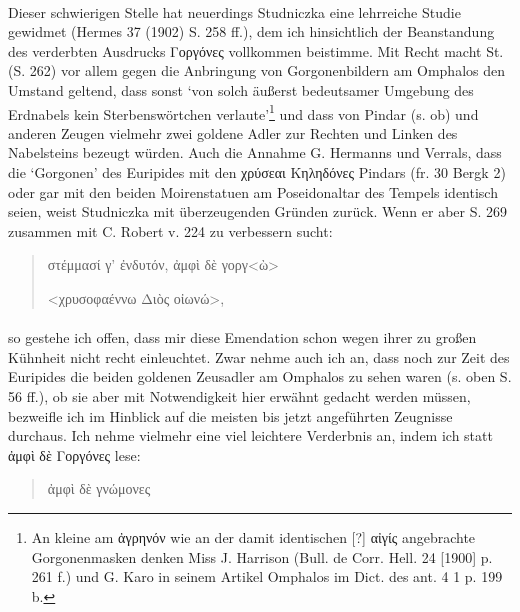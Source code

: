 \documentclass[a4paper, 11pt, oneside]{article}
\begin{document}
\paragraph{}
Dieser schwierigen Stelle hat neuerdings Studniczka eine lehrreiche Studie gewidmet (Hermes 37 (1902) S. 258 ff.), dem ich hinsichtlich der Beanstandung des verderbten Ausdrucks Γοργόνες vollkommen beistimme. Mit Recht macht St. (S. 262) vor allem gegen die Anbringung von Gorgonenbildern am Omphalos den Umstand geltend, dass sonst `von solch äußerst bedeutsamer Umgebung des Erdnabels kein Sterbenswörtchen verlaute'\footnote{An kleine am ἀγρηνόν wie an der damit identischen [?] αἰγίς angebrachte Gorgonenmasken denken Miss J. Harrison (Bull. de Corr. Hell. 24 [1900] p. 261 f.) und G. Karo in seinem Artikel Omphalos im Dict. des ant. 4 1 p. 199 b.} und dass von Pindar (s. ob) und anderen Zeugen vielmehr zwei goldene Adler zur Rechten und Linken des Nabelsteins bezeugt würden. Auch die Annahme G. Hermanns und Verrals, dass die `Gorgonen' des Euripides mit den χρύσεαι Κηληδόνες Pindars (fr. 30 Bergk 2) oder gar mit den beiden Moirenstatuen am Poseidonaltar des Tempels identisch seien, weist Studniczka mit überzeugenden Gründen zurück. Wenn er aber S. 269 zusammen mit C. Robert v. 224 zu verbessern sucht:
\begin{quotation}
στέμμασί γ' ἐνδυτόν, ἀμφὶ δὲ γοργ<ὼ>

<χρυσοφαέννω Διὸς οἰωνώ>,
\end{quotation}
\paragraph{}
so gestehe ich offen, dass mir diese Emendation schon wegen ihrer zu großen Kühnheit nicht recht einleuchtet. Zwar nehme auch ich an, dass noch zur Zeit des Euripides die beiden goldenen Zeusadler am Omphalos zu sehen waren (s. oben S. 56 ff.), ob sie aber mit Notwendigkeit hier erwähnt gedacht werden müssen, bezweifle ich im Hinblick auf die meisten bis jetzt angeführten Zeugnisse durchaus. Ich nehme vielmehr eine viel leichtere Verderbnis an, indem ich statt ἀμφὶ δὲ Γοργόνες lese:
\begin{quotation}
ἀμφὶ δὲ γνώμονες
\end{quotation}
\end{document}
